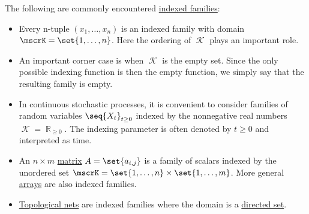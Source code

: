 \begin{example}\label{ex:def:indexed_family}
  The following are commonly encountered \hyperref[def:indexed_family]{indexed families}:

  \begin{itemize}
    \item Every n-tuple \( (x_1, \ldots, x_n) \) is an indexed family with domain \( \mscrK = \set{ 1, \ldots, n } \). Here the ordering of \( \mscrK \) plays an important role.

    \item An important corner case is when \( \mscrK \) is the empty set. Since the only possible indexing function is then the empty function, we simply say that the resulting family is empty.

    \item In continuous stochastic processes, it is convenient to consider families of random variables \( \seq{ X_t }_{t \geq 0} \) indexed by the nonnegative real numbers \( \mscrK = \BbbR_{\geq 0} \). The indexing parameter is often denoted by \( t \geq 0 \) and interpreted as time.

    \item An \( n \times m \) \hyperref[def:array/matrix]{matrix} \( A = \set{ a_{i,j} } \) is a family of scalars indexed by the unordered set \( \mscrK = \set{ 1, \ldots, n } \times \set{ 1, \ldots, m } \). More general \hyperref[def:array]{arrays} are also indexed families.

    \item \hyperref[def:topological_net]{Topological nets} are indexed families where the domain is a \hyperref[def:directed_set]{directed set}.
  \end{itemize}
\end{example}

